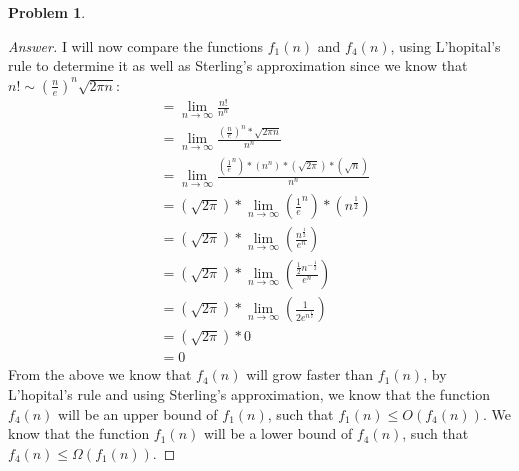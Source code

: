 \documentclass[11pt]{article}
\theoremstyle{definition}
\theoremstyle{definition}
\newtheorem{required}{Problem}
\theoremstyle{definition}
\begin{document}
\begin{required}
\begin{enumerate}[label=(\alph*)]
\begin{proof}[Answer]
I will now compare the functions $f_1(n)$ and $f_4(n)$, using L'hopital's rule to determine it as well as Sterling's approximation since we know that $n! \sim \left(\frac{n}{e}\right)^n \sqrt{2 \pi n}$: \\
\begin{align*}
&= \lim_{n \to \infty} \frac{n!}{n^{n}}\\
&= \lim_{n \to \infty} \frac{(\frac{n}{e})^{n} * \sqrt {2\pi n}}{n^{n}} \\
&= \lim_{n \to \infty} \frac{(\frac{1}{e}^{n})*(n^{n})*(\sqrt{2\pi})*(\sqrt{n})}{n^{n}} \\
&=(\sqrt{2\pi})* \lim_{n \to \infty} (\frac{1}{e}^{n})*(n^{\frac{1}{2}}) \\
&=(\sqrt{2\pi})* \lim_{n \to \infty} (\frac{n^{\frac{1}{2}}}{e^{n}}) \\
&=(\sqrt{2\pi})* \lim_{n \to \infty} (\frac{\frac{1}{2}n^{-\frac{1}{2}}}{e^{n}}) \\
&=(\sqrt{2\pi})* \lim_{n \to \infty} (\frac{1}{2e^{n^\frac{1}{2}}}) \\
&=(\sqrt{2\pi})*0 \\
&=0
\end{align*}
From the above we know that $f_4(n)$ will grow faster than $f_1(n)$, by L'hopital's rule and using Sterling's approximation, we know that the function $f_4(n)$ will be an upper bound of $f_1(n)$, such that $f_1(n) \leq O(f_4(n))$. We know that the function $f_1(n)$ will be a lower bound of $f_4(n)$, such that $f_4(n) \leq \Omega(f_1(n))$.


\end{proof}
\end{enumerate}
\end{required}
\end{document}
